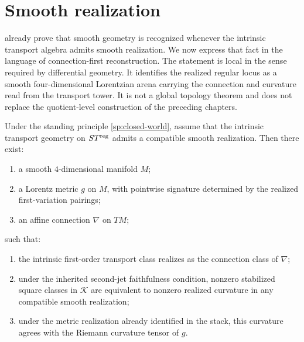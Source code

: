 \section{Smooth realization}
\label{sec:connection-smooth-realization}
 already prove that
smooth geometry is recognized
whenever the intrinsic transport algebra admits smooth realization.  We
now express that fact in the language of connection-first
reconstruction.
The statement is local in the sense required by differential geometry.
It identifies the realized regular locus as a smooth four-dimensional
Lorentzian arena carrying the connection and curvature read from the
transport tower.  It is not a global topology theorem and does not
replace the quotient-level construction of the preceding chapters.
\begin{theorem}
	\label{thm:connection-smooth-realization}
	Under the standing principle \cref{sp:closed-world}, assume that the
	intrinsic transport geometry on \(ST^{\mathrm{reg}}\) admits a compatible
	smooth realization.  Then there exist:
	\begin{enumerate}[label=\textup{(\roman*)}]
		\item
		      a smooth \(4\)-dimensional manifold \(M\);
		\item
		      a Lorentz metric \(g\) on \(M\), with pointwise signature determined by
		      the realized first-variation pairings;
		\item
		      an affine connection \(\nabla\) on \(TM\);
	\end{enumerate}
	such that:
	\begin{enumerate}[label=\textup{(\alph*)}]
		\item
		      the intrinsic first-order transport class realizes as the connection
		      class of \(\nabla\);
		\item
		      under the inherited second-jet faithfulness condition, nonzero
		      stabilized square classes in \(\mathcal K\) are equivalent to
		      nonzero realized curvature in any compatible smooth realization;
		\item
		      under the metric realization already identified in the stack, this
		      curvature agrees with the Riemann curvature tensor of \(g\).
	\end{enumerate}
\end{theorem}
